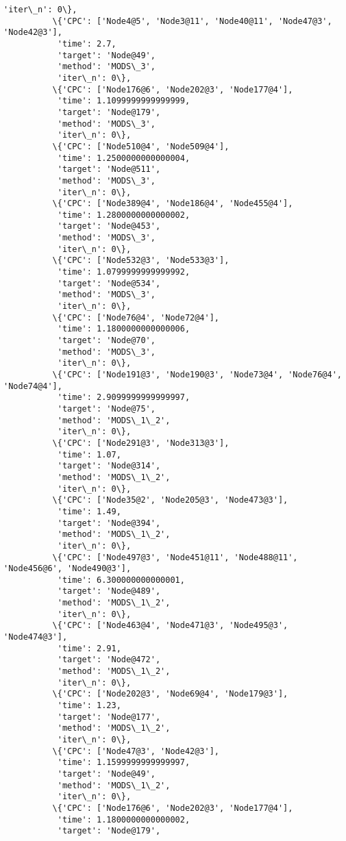 \documentclass[11pt]{article}
\begin{document}
\begin{Verbatim}[commandchars=\\\{\}]
           'iter\_n': 0\},
          \{'CPC': ['Node4@5', 'Node3@11', 'Node40@11', 'Node47@3', 'Node42@3'],
           'time': 2.7,
           'target': 'Node@49',
           'method': 'MODS\_3',
           'iter\_n': 0\},
          \{'CPC': ['Node176@6', 'Node202@3', 'Node177@4'],
           'time': 1.1099999999999999,
           'target': 'Node@179',
           'method': 'MODS\_3',
           'iter\_n': 0\},
          \{'CPC': ['Node510@4', 'Node509@4'],
           'time': 1.2500000000000004,
           'target': 'Node@511',
           'method': 'MODS\_3',
           'iter\_n': 0\},
          \{'CPC': ['Node389@4', 'Node186@4', 'Node455@4'],
           'time': 1.2800000000000002,
           'target': 'Node@453',
           'method': 'MODS\_3',
           'iter\_n': 0\},
          \{'CPC': ['Node532@3', 'Node533@3'],
           'time': 1.0799999999999992,
           'target': 'Node@534',
           'method': 'MODS\_3',
           'iter\_n': 0\},
          \{'CPC': ['Node76@4', 'Node72@4'],
           'time': 1.1800000000000006,
           'target': 'Node@70',
           'method': 'MODS\_3',
           'iter\_n': 0\},
          \{'CPC': ['Node191@3', 'Node190@3', 'Node73@4', 'Node76@4', 'Node74@4'],
           'time': 2.9099999999999997,
           'target': 'Node@75',
           'method': 'MODS\_1\_2',
           'iter\_n': 0\},
          \{'CPC': ['Node291@3', 'Node313@3'],
           'time': 1.07,
           'target': 'Node@314',
           'method': 'MODS\_1\_2',
           'iter\_n': 0\},
          \{'CPC': ['Node35@2', 'Node205@3', 'Node473@3'],
           'time': 1.49,
           'target': 'Node@394',
           'method': 'MODS\_1\_2',
           'iter\_n': 0\},
          \{'CPC': ['Node497@3', 'Node451@11', 'Node488@11', 'Node456@6', 'Node490@3'],
           'time': 6.300000000000001,
           'target': 'Node@489',
           'method': 'MODS\_1\_2',
           'iter\_n': 0\},
          \{'CPC': ['Node463@4', 'Node471@3', 'Node495@3', 'Node474@3'],
           'time': 2.91,
           'target': 'Node@472',
           'method': 'MODS\_1\_2',
           'iter\_n': 0\},
          \{'CPC': ['Node202@3', 'Node69@4', 'Node179@3'],
           'time': 1.23,
           'target': 'Node@177',
           'method': 'MODS\_1\_2',
           'iter\_n': 0\},
          \{'CPC': ['Node47@3', 'Node42@3'],
           'time': 1.1599999999999997,
           'target': 'Node@49',
           'method': 'MODS\_1\_2',
           'iter\_n': 0\},
          \{'CPC': ['Node176@6', 'Node202@3', 'Node177@4'],
           'time': 1.1800000000000002,
           'target': 'Node@179',

\end{Verbatim}
\end{document}

